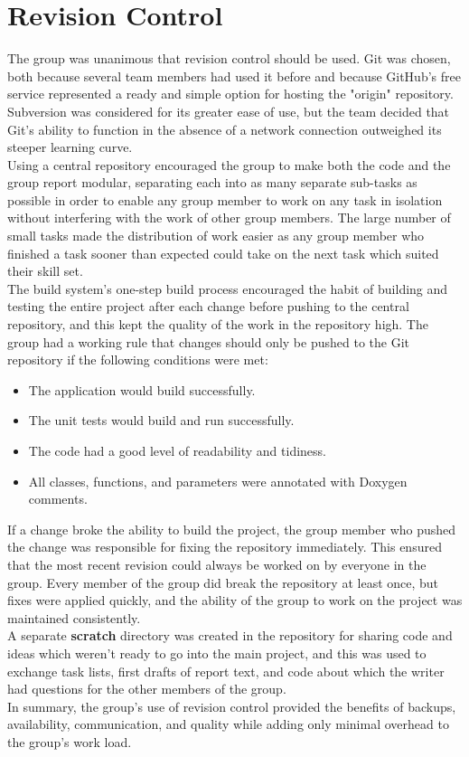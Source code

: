 \section{Revision Control}
\label{Revision Control}

The group was unanimous that revision control should be used. Git was chosen, both because several team members had used it before and because GitHub's free service represented a ready and simple option for hosting the "origin" repository.
Subversion was considered for its greater ease of use, but the team decided that Git's ability to function in the absence of a network connection outweighed its steeper learning curve.\\

Using a central repository encouraged the group to make both the code and the group report modular, separating each into as many separate sub-tasks as possible in order to enable any group member to work on any task in isolation without interfering with the work of other group members.
The large number of small tasks made the distribution of work easier as any group member who finished a task sooner than expected could take on the next task which suited their skill set.\\

The build system's one-step build process encouraged the habit of building and testing the entire project after each change before pushing to the central repository, and this kept the quality of the work in the repository high.
The group had a working rule that changes should only be pushed to the Git repository if the following conditions were met:

\begin{itemize}
  \item The application would build successfully.
  \item The unit tests would build and run successfully.
  \item The code had a good level of readability and tidiness.
  \item All classes, functions, and parameters were annotated with Doxygen comments.
\end{itemize}

If a change broke the ability to build the project, the group member who pushed the change was responsible for fixing the repository immediately.
This ensured that the most recent revision could always be worked on by everyone in the group. Every member of the group did break the repository at least once, but fixes were applied quickly, and the ability of the group to work on the project was maintained consistently.\\

A separate \textbf{scratch} directory was created in the repository for sharing code and ideas which weren't ready to go into the main project, and this was used to exchange task lists, first drafts of report text, and code about which the writer had questions for the other members of the group.\\

In summary, the group's use of revision control provided the benefits of backups, availability, communication, and quality while adding only minimal overhead to the group's work load.  
